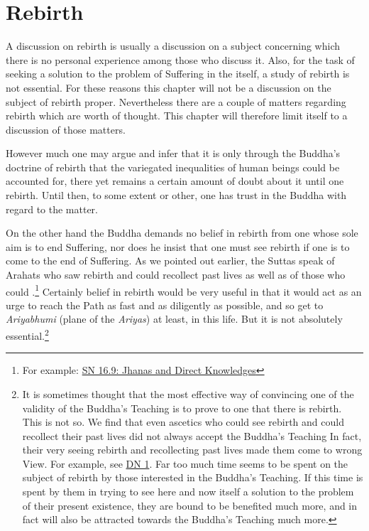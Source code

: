 \chapter{Rebirth}

A discussion on rebirth is usually a discussion on a subject concerning which there is no personal experience among those who discuss it. Also, for the task of seeking a solution to the  problem of Suffering in the  itself, a study of rebirth is not essential. For these reasons this chapter will not be a discussion on the subject of rebirth proper. Nevertheless there are a couple of matters regarding rebirth which are worth of thought. This chapter will therefore limit itself to a discussion of those matters.

However much one may argue and infer that it is only through the Buddha's doctrine of rebirth that the variegated inequalities of human beings could be accounted for, there yet remains a certain amount of doubt about it until one  rebirth. Until then, to some extent or other, one has trust in the Buddha with regard to the matter.

On the other hand the Buddha demands no belief in rebirth from one whose sole aim is to end Suffering, nor does he insist that one must see rebirth if one is to come to the end of Suffering. As we pointed out earlier, the Suttas speak of Arahats who saw rebirth and could recollect past lives as well as of those who could .\footnote{For example: \href{https://suttacentral.net/sn16.9/en/bodhi}{SN 16.9: Jhanas and Direct Knowledges}} Certainly belief in rebirth would be very useful in that it would act as an urge to reach the Path as fast and as diligently as possible, and so get to \emph{Ariyabhumi} (plane of the \emph{Ariyas}) at least, in this life. But it is not absolutely essential.\footnote{It is sometimes thought that the most effective way of convincing one of the validity of the Buddha's Teaching is to prove to one that there is rebirth. This is not so. We find that even ascetics who could see rebirth and could recollect their past lives did not always accept the Buddha's Teaching In fact, their very seeing rebirth and recollecting past lives made them come to wrong View. For example, see \href{https://suttacentral.net/dn1/en/bodhi}{DN 1}. Far too much time seems to be spent on the subject of rebirth by those interested in the Buddha's Teaching. If this time is spent by them in trying to see here and now itself a solution to the problem of their present existence, they are bound to be benefited much more, and in fact will also be attracted towards the Buddha's Teaching much more.}

